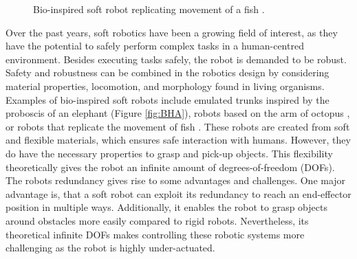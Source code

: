\begin{minipage}{\linewidth}
\begin{minipage}{0.44\linewidth}
\begin{figure}[H]
              \caption{Bio-inspired soft robot replicating movement of a fish \cite{marchese2014autonomous}.}
          \end{figure}
      \end{minipage}
  \end{minipage}

Over the past years, soft robotics have been a growing field of interest, as they have the potential to safely perform complex tasks in a human-centred environment. Besides executing tasks safely, the robot is demanded to be robust. Safety and robustness can be combined in the robotics design by considering material properties, locomotion, and morphology found in living organisms. Examples of bio-inspired soft robots include emulated trunks \cite{hannan2003kinematics} inspired by the proboscis of an elephant (Figure \ref{fig:BHA}), robots based on the arm of octopus \cite{wang2013visual}, or robots that replicate the movement of fish \cite{marchese2014autonomous}. These robots are created from soft and flexible materials, which ensures safe interaction with humans. However, they do have the necessary properties to grasp and pick-up objects. This flexibility theoretically gives the robot an infinite amount of degrees-of-freedom (DOFs). The robots redundancy gives rise to some advantages and challenges. One major advantage is, that a soft robot can exploit its redundancy to reach an end-effector position in multiple ways. Additionally, it enables the robot to grasp objects around obstacles more easily compared to rigid robots. Nevertheless, its theoretical infinite DOFs makes controlling these robotic systems more challenging as the robot is highly under-actuated. 

